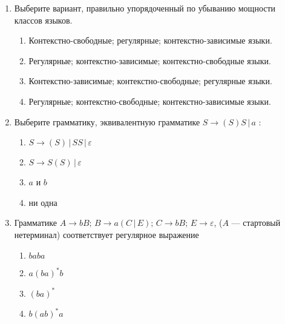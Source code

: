 \documentclass[12pt]{article}
\begin{document}
\begin{enumerate}
    \item Выберите вариант, правильно упорядоченный по убыванию мощности классов языков.
    \begin{enumerate}
        \item Контекстно-свободные; регулярные; контекстно-зависимые языки.
        \item Регулярные; контекстно-зависимые; контекстно-свободные языки.
        \item Контекстно-зависимые; контекстно-свободные; регулярные языки.
        \item Регулярные; контекстно-свободные; контекстно-зависимые языки. 
    \end{enumerate} 
            
    \item Выберите грамматику, эквивалентную грамматике $S \rightarrow ( S ) S \, | \, a $ :
    \begin{enumerate}
        \item $S \rightarrow ( S ) \, | \, S S \, | \, \varepsilon $
        \item $S \rightarrow S ( S ) \, | \, \varepsilon $ 
        \item $a$ и $b$
        \item ни одна
    \end{enumerate}


    \item Грамматике $A \rightarrow b B; \, B \rightarrow a (C \, | \, E); \, C \rightarrow b B; \, E \rightarrow \varepsilon$, ($A$ --- стартовый нетерминал) соответствует регулярное выражение
    \begin{enumerate}
        \item $b a b a$
        \item $a ( b a )^* b$
        \item $(b a)^*$
        \item $b (a b)^* a$
    \end{enumerate}
\end{enumerate}
\end{document}
